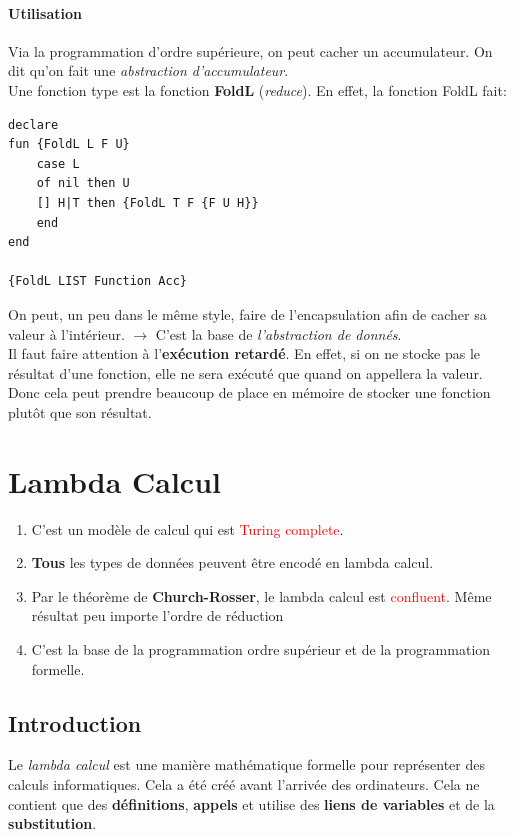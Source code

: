 \documentclass{report}
\begin{document}
\subsubsection{Utilisation}
Via la programmation d'ordre supérieure, on peut cacher un accumulateur. On dit qu'on fait une \textit{abstraction d'accumulateur}.\\
Une fonction type est la fonction \textbf{FoldL} (\textit{reduce}). En effet, la fonction FoldL fait:
\begin{lstlisting}
declare
fun {FoldL L F U}
	case L
	of nil then U
	[] H|T then {FoldL T F {F U H}}
	end
end

{FoldL LIST Function Acc}
\end{lstlisting}
On peut, un peu dans le même style, faire de l'encapsulation afin de cacher sa valeur à l'intérieur. $\rightarrow$ C'est la base de \textit{l'abstraction de donnés}.\\

Il faut faire attention à l'\textbf{exécution retardé}. En effet, si on ne stocke pas le résultat d'une fonction, elle ne sera exécuté que quand on appellera la valeur. Donc cela peut prendre beaucoup de place en mémoire de stocker une fonction plutôt que son résultat.


\chapter{Lambda Calcul}
\begin{enumerate}
\item C'est un modèle de calcul qui est \textcolor{red}{Turing complete}. 
\item \textbf{Tous} les types de données peuvent être encodé en lambda calcul.
\item Par le théorème de \textbf{Church-Rosser}, le lambda calcul est \textcolor{red}{confluent}. Même résultat peu importe l'ordre de réduction
\item C'est la base de la programmation ordre supérieur et de la programmation formelle.
\end{enumerate}
\section{Introduction}
Le \textit{lambda calcul} est une manière mathématique formelle pour représenter des calculs informatiques. Cela a été créé avant l'arrivée des ordinateurs. Cela ne contient que des \textbf{définitions}, \textbf{appels} et utilise des \textbf{liens de variables} et de la \textbf{substitution}.\\
\end{document}
